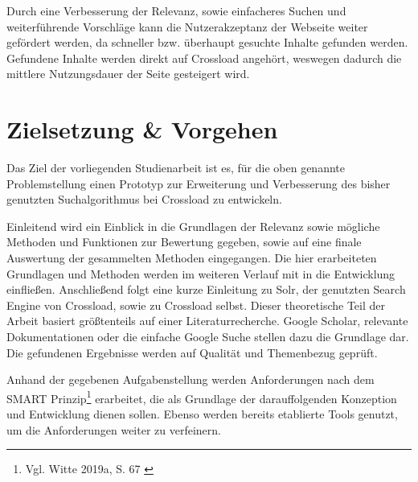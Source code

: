 Durch eine Verbesserung der Relevanz, sowie einfacheres Suchen und weiterführende Vorschläge kann die Nutzerakzeptanz der Webseite weiter gefördert werden, da schneller bzw. überhaupt gesuchte Inhalte gefunden werden.
Gefundene Inhalte werden direkt auf Crossload angehört, weswegen dadurch die mittlere Nutzungsdauer der Seite gesteigert wird.

\section{Zielsetzung \& Vorgehen}
\label{sec:methods}
Das Ziel der vorliegenden Studienarbeit ist es, für die oben genannte Problemstellung einen Prototyp zur Erweiterung und Verbesserung des bisher genutzten Suchalgorithmus bei Crossload zu entwickeln.

Einleitend wird ein Einblick in die Grundlagen der Relevanz sowie mögliche Methoden und Funktionen zur Bewertung gegeben, sowie auf eine finale Auswertung der gesammelten Methoden eingegangen.
Die hier erarbeiteten Grundlagen und Methoden werden im weiteren Verlauf mit in die Entwicklung einfließen.
Anschließend folgt eine kurze Einleitung zu Solr, der genutzten Search Engine von Crossload, sowie zu Crossload selbst.
Dieser theoretische Teil der Arbeit basiert größtenteils auf einer Literaturrecherche.
Google Scholar, relevante Dokumentationen oder die einfache Google Suche stellen dazu die Grundlage dar.
Die gefundenen Ergebnisse werden auf Qualität und Themenbezug geprüft.

Anhand der gegebenen Aufgabenstellung werden Anforderungen nach dem SMART Prinzip\footnote{Vgl. Witte 2019a, S. 67 \cite{witte2016}} erarbeitet, die als Grundlage der darauffolgenden Konzeption und Entwicklung dienen sollen.
Ebenso werden bereits etablierte Tools genutzt, um die Anforderungen weiter zu verfeinern.

